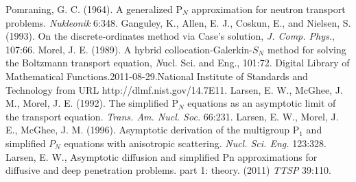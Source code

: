 \documentclass[12pt]{article}
\begin{document}
\begin{thebibliography}{99}
 Pomraning, G. C. (1964). A generalized P$_N$ approximation for neutron transport
problems. \emph{Nukleonik} 6:348.
 Ganguley, K., Allen, E. J., Coskun, E., and Nielsen, S. (1993). 
On the discrete-ordinates method via Case's solution, \emph{J. Comp. Phys.}, 107:66.
 Morel, J. E. (1989). A hybrid collocation-Galerkin-$S_N$  method for solving the
Boltzmann transport equation, {\emph Nucl. Sci. and Eng.}, 101:72.
  Digital Library of Mathematical Functions.2011-08-29.National Institute of Standards and Technology from URL http://dlmf.nist.gov/14.7E11.
 Larsen, E. W., McGhee, J. M., Morel, J. E. (1992). The simplified P$_N$ equations
as an asymptotic limit of the transport equation. \emph{Trans. Am. Nucl. Soc.} 66:231.
 Larsen, E. W., Morel, J. E., McGhee, J. M. (1996). Asymptotic derivation of the
multigroup P$_1$ and simplified $P_N$ equations with anisotropic scattering. \emph{Nucl. Sci. Eng.}
123:328.
 Larsen, E. W., Asymptotic diffusion and simplified Pn
approximations for diffusive and deep
penetration problems. part 1: theory. (2011) \emph{TTSP} 39:110.
\end{thebibliography} 
\end{document}
